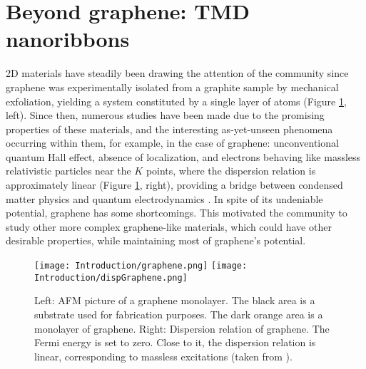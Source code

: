 \section{Beyond graphene: TMD nanoribbons}
\label{sec:state}

\ac{2D} materials have steadily been drawing the attention of the community since graphene was experimentally isolated from a graphite sample by mechanical exfoliation, yielding a system constituted by a single layer of atoms (Figure \ref{fig:graphene}, left).
Since then, numerous studies have been made due to the promising properties of these materials, and the interesting as-yet-unseen phenomena occurring within them, for example, in the case of graphene: unconventional quantum Hall effect, absence of localization, and electrons behaving like massless relativistic particles near the $K$ points, where the dispersion relation is approximately linear (Figure \ref{fig:graphene}, right), providing a bridge between condensed matter physics and quantum electrodynamics \cite{katsnelson_graphene:_2007}.
In spite of its undeniable potential, graphene has some shortcomings.
This motivated the community to study other more complex graphene-like materials, which could have other desirable properties, while maintaining most of graphene's potential.

\begin{figure}[H]
\hspace{1.5cm}
\texttt{[image: Introduction/graphene.png]}
\hspace{2cm}
\texttt{[image: Introduction/dispGraphene.png]}
\caption[Graphene monolayer; graphene's dispersion relation.]{Left: \acf{AFM} picture of a graphene monolayer. The black area is a substrate used for fabrication purposes. The dark orange area is a monolayer of graphene. Right: Dispersion relation of graphene. The Fermi energy is set to zero. Close to it, the dispersion relation is linear, corresponding to massless excitations (taken from \cite{castro_neto_electronic_2009}). }
\label{fig:graphene}
\end{figure}	

